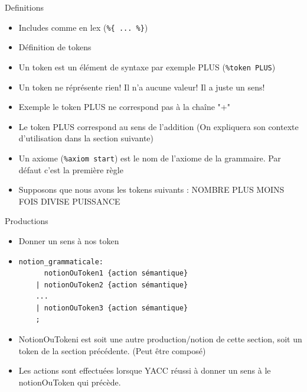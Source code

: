 \begin{frame}[containsverbatim]{\ftitle}
\def\blocktitle{Definitions}
\begin{block}{\blocktitle}
\begin{itemize}
\item Includes comme en lex (\verb!%{ ... %}!)
\item Définition de tokens
\item Un token est un élément de syntaxe par exemple PLUS (\verb!%token PLUS!)
\item Un token ne réprésente rien! Il n'a aucune valeur! Il a juste un sens!
\item Exemple le token PLUS ne correspond pas à la chaîne "+"
\item Le token PLUS correspond au sens de l'addition (On expliquera son contexte d'utilisation dans la section suivante)
\item Un axiome (\verb!%axiom start!) est le nom de l'axiome de la grammaire. Par défaut c'est la première règle
\item Supposons que nous avons les tokens suivants : NOMBRE PLUS  MOINS FOIS  DIVISE  PUISSANCE

\end{itemize}
\end{block}
\end{frame}




\begin{frame}[containsverbatim]{\ftitle}
\def\blocktitle{Productions}
\begin{block}{\blocktitle}
\begin{itemize}
\item Donner un sens à nos token
\item \begin{verbatim}
notion_grammaticale:
	  notionOuToken1 {action sémantique}
	| notionOuToken2 {action sémantique}
	...
	| notionOuToken3 {action sémantique}
	;
\end{verbatim}
\item NotionOuTokeni est soit une autre production/notion de cette section, soit un token de la section précédente. (Peut être composé)
\item Les actions sont effectuées lorsque YACC réussi à donner un sens à le notionOuToken qui précède.
\end{itemize}
\end{block}
\end{frame}


